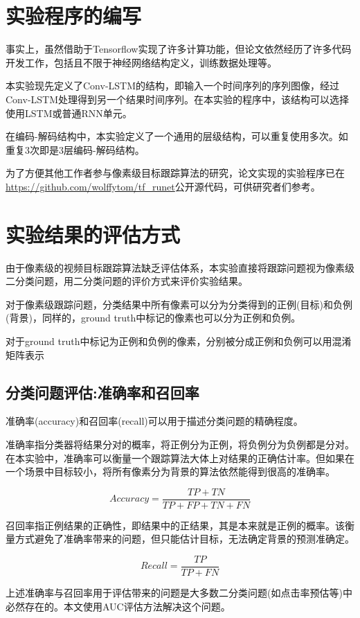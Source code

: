 \section{实验程序的编写} \label{section:software}
事实上，虽然借助于Tensorflow实现了许多计算功能，但论文依然经历了许多代码开发工作，包括且不限于神经网络结构定义，训练数据处理等。
\par
本实验现先定义了Conv-LSTM的结构，即输入一个时间序列的序列图像，经过Conv-LSTM处理得到另一个结果时间序列。在本实验的程序中，该结构可以选择使用LSTM或普通RNN单元。
\par
在编码-解码结构中，本实验定义了一个通用的层级结构，可以重复使用多次。如重复3次即是3层编码-解码结构。
\par
为了方便其他工作者参与像素级目标跟踪算法的研究，论文实现的实验程序已在\url{https://github.com/wolffytom/tf_runet}公开源代码，可供研究者们参考。

\section{实验结果的评估方式}
由于像素级的视频目标跟踪算法缺乏评估体系，本实验直接将跟踪问题视为像素级二分类问题，用二分类问题的评价方式来评价实验结果。
\par
对于像素级跟踪问题，分类结果中所有像素可以分为分类得到的正例(目标)和负例(背景)，同样的，ground truth中标记的像素也可以分为正例和负例。
\par
对于ground truth中标记为正例和负例的像素，分别被分成正例和负例可以用混淆矩阵表示
\subsection{分类问题评估:准确率和召回率}
准确率(accuracy)和召回率(recall)可以用于描述分类问题的精确程度。
\par
准确率指分类器将结果分对的概率，将正例分为正例，将负例分为负例都是分对。在本实验中，准确率可以衡量一个跟踪算法大体上对结果的正确估计率。但如果在一个场景中目标较小，将所有像素分为背景的算法依然能得到很高的准确率。
\par
\begin{equation}\label{equ:accuracy}  Accuracy=\frac{TP+TN}{TP+FP+TN+FN}  \end{equation}
\par
召回率指正例结果的正确性，即结果中的正结果，其是本来就是正例的概率。该衡量方式避免了准确率带来的问题，但只能估计目标，无法确定背景的预测准确定。
\par
\begin{equation}\label{equ:recall}  Recall=\frac{TP}{TP+FN}  \end{equation}
\par
上述准确率与召回率用于评估带来的问题是大多数二分类问题(如点击率预估等)中必然存在的。本文使用AUC评估方法解决这个问题。

